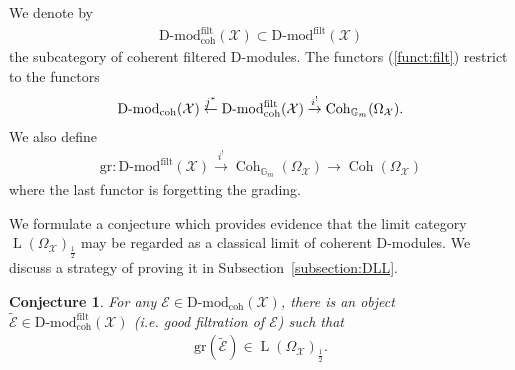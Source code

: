 \documentclass [11pt,oneside,a4paper,mathscr]{amsart}
\newtheorem{conj}[thm]{Conjecture}
\theoremstyle{definition}
\newcommand{\LL}{\operatorname{L}}
\newcommand{\QCoh}{\operatorname{QCoh}}
\newcommand{\Coh}{\operatorname{Coh}}
\begin{document}
We denote by 
\begin{align*}
    \text{D-mod}^{\mathrm{filt}}_{\mathrm{coh}}(\mathcal{X}) \subset \text{D-mod}^{\mathrm{filt}}(\mathcal{X})
\end{align*}
the subcategory of coherent filtered D-modules. The functors (\ref{funct:filt})
restrict to the functors
\begin{align}\notag
    \text{D-mod}_{\mathrm{coh}}(\mathcal{X}) \stackrel{j^*}{\leftarrow} \text{D-mod}^{\mathrm{filt}}_{\mathrm{coh}}(\mathcal{X}) \stackrel{i^!}{\to} \Coh_{\mathbb{G}_m}(\Omega_{\mathcal{X}}). 
\end{align}
We also define 
\begin{align*}
    \mathrm{gr} \colon \text{D-mod}^{\mathrm{filt}}(\mathcal{X})
    \stackrel{i^!}{\to} \Coh_{\mathbb{G}_m}(\Omega_{\mathcal{X}}) \to
    \Coh(\Omega_{\mathcal{X}})
\end{align*}
where the last functor is forgetting the grading. 

We formulate a conjecture which provides evidence that the limit category $\LL(\Omega_{\mathcal{X}})_{\frac{1}{2}}$
may be regarded as a classical limit of coherent D-modules. We discuss a strategy of proving it in Subsection~\ref{subsection:DLL}.
\begin{conj}\label{conj:L}
For any $\mathcal{E} \in \mathrm{D}\text{-}\mathrm{mod}_{\mathrm{coh}}(\mathcal{X})$, there is 
an object $\widetilde{\mathcal{E}} \in \mathrm{D}\text{-}\mathrm{mod}^{\mathrm{filt}}_{\mathrm{coh}}(\mathcal{X})$
(i.e. good filtration of $\mathcal{E}$) such that 
\begin{align*}
    \mathrm{gr}(\widetilde{\mathcal{E}}) \in \LL(\Omega_{\mathcal{X}})_{\frac{1}{2}}. 
\end{align*}
\end{conj}
\end{document}
